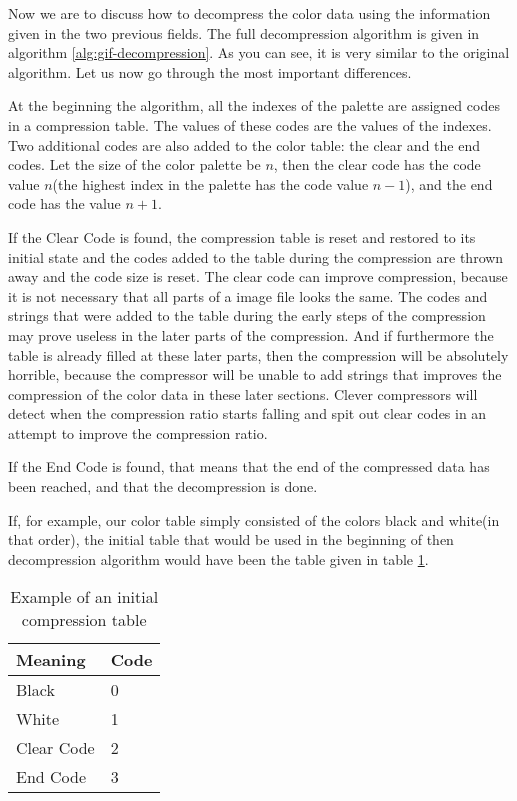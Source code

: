 Now we are to discuss how to decompress the color data using the
information given in the two previous fields. The full decompression
algorithm is given in algorithm \ref{alg:gif-decompression}. As you
can see, it is very similar to the original \lzw algorithm. Let us
now go through the most important differences.

At the beginning the algorithm, all the indexes of the palette are
assigned codes in a compression table. The values of these codes are
the values of the indexes. Two additional codes are also added to the
color table: the clear and the end codes. Let the size of the color
palette be $n$, then the clear code has the code value $n$(the highest
index in the palette has the code value $n-1$), and the end code has
the value $n+1$.

If the Clear Code is found, the compression table is reset and
restored to its initial state and the codes added to the table during
the compression are thrown away and the code size is reset. The clear
code can improve compression, because it is not necessary that all
parts of a image file looks the same. The codes and strings that were
added to the table during the early steps of the compression may prove
useless in the later parts of the compression. And if furthermore the
table is already filled at these later parts, then the compression
will be absolutely horrible, because the compressor will be unable to
add strings that improves the compression of the color data in these
later sections. Clever \gif compressors will detect when the
compression ratio starts falling and spit out clear codes in an
attempt to improve the compression ratio.

If the End Code is found, that means that the end of the compressed
data has been reached, and that the decompression is done.

If, for example, our color table simply consisted of the colors black
and white(in that order), the initial table that would be used in the
beginning of then decompression algorithm would have been the table
given in table \ref{tab:example-gif-color-table}.

\begin{table}
  \centering
  \begin{tabular}{ll}
    \toprule
    Meaning & Code \\
    \midrule
    Black & 0 \\
    White & 1 \\
    Clear Code & 2 \\
    End Code & 3 \\
    \bottomrule
  \end{tabular}
  \caption{Example of an initial \gif compression table}
  \label{tab:example-gif-color-table}
\end{table}

